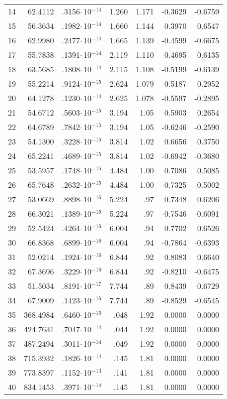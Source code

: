 {\begin{longtable}{lrrrrrr}
14 & 62.4112 & .3156$\cdot$\,10$^{-14}$ & 1.260 & 1.171 & -0.3629 & -0.6759 \\
15 & 56.3634 & .1982$\cdot$\,10$^{-14}$ & 1.660 & 1.144 & 0.3970 &  0.6547 \\
16 & 62.9980 & .2477$\cdot$\,10$^{-14}$ & 1.665 & 1.139 & -0.4599 & -0.6675 \\
17 & 55.7838 & .1391$\cdot$\,10$^{-14}$ & 2.119 & 1.110 & 0.4695 & 0.6135 \\
18 & 63.5685 & .1808$\cdot$\,10$^{-14}$ & 2.115 & 1.108 & -0.5199 & -0.6139 \\
19 & 55.2214 & .9124$\cdot$\,10$^{-15}$ & 2.624 & 1.079 & 0.5187 & 0.2952 \\
20 & 64.1278 & .1230$\cdot$\,10$^{-14}$ & 2.625 & 1.078 & -0.5597 & -0.2895 \\
21 & 54.6712 & .5603$\cdot$\,10$^{-15}$ & 3.194 & 1.05 & 0.5903 & 0.2654 \\
22 & 64.6789 & .7842$\cdot$\,10$^{-15}$ & 3.194 & 1.05 & -0.6246 & -0.2590 \\
23 & 54.1300 & .3228$\cdot$\,10$^{-15}$ & 3.814 & 1.02 & 0.6656 & 0.3750 \\
24 & 65.2241 & .4689$\cdot$\,10$^{-15}$ & 3.814 & 1.02 & -0.6942 & -0.3680 \\
25 & 53.5957 & .1748$\cdot$\,10$^{-15}$ & 4.484 & 1.00 & 0.7086 & 0.5085 \\
26 & 65.7648 & .2632$\cdot$\,10$^{-15}$ & 4.484 & 1.00 & -0.7325 & -0.5002 \\
27 & 53.0669 & .8898$\cdot$\,10$^{-16}$ & 5.224 & .97 & 0.7348 & 0.6206 \\
28 & 66.3021 & .1389$\cdot$\,10$^{-15}$ & 5.224 & .97 & -0.7546 & -0.6091 \\
29 & 52.5424 & .4264$\cdot$\,10$^{-16}$ & 6.004 & .94 & 0.7702 & 0.6526 \\
30 & 66.8368 & .6899$\cdot$\,10$^{-16}$ & 6.004 & .94 & -0.7864 & -0.6393 \\
31 & 52.0214 & .1924$\cdot$\,10$^{-16}$ & 6.844 & .92 & 0.8083 & 0.6640 \\
32 & 67.3696 & .3229$\cdot$\,10$^{-16}$ & 6.844 & .92 & -0.8210 & -0.6475 \\
33 & 51.5034 & .8191$\cdot$\,10$^{-17}$ & 7.744 & .89 & 0.8439 & 0.6729 \\
34 & 67.9009 & .1423$\cdot$\,10$^{-16}$ & 7.744 & .89 & -0.8529 & -0.6545 \\
35 & 368.4984 & .6460$\cdot$\,10$^{-15}$ & .048 & 1.92 & 0.0000 & 0.0000 \\
36 & 424.7631 & .7047$\cdot$\,10$^{-14}$ & .044 & 1.92 & 0.0000 & 0.0000 \\
37 & 487.2494 & .3011$\cdot$\,10$^{-14}$ & .049 & 1.92 & 0.0000 & 0.0000 \\
38 & 715.3932 & .1826$\cdot$\,10$^{-14}$ & .145 & 1.81 & 0.0000 & 0.0000 \\
39 & 773.8397 & .1152$\cdot$\,10$^{-13}$ & .141 & 1.81 & 0.0000 & 0.0000 \\
40 & 834.1453 &  .3971$\cdot$\,10$^{-14}$ & .145 & 1.81 & 0.0000 & 0.0000 \\
\end{longtable}

}
